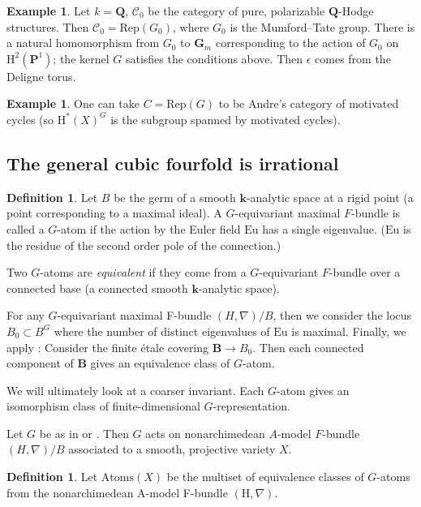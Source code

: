 \documentclass[11pt, reqno]{amsart}
\numberwithin{equation}{section}
\theoremstyle{plain}
\theoremstyle{definition}
\newtheorem{definition}[theorem]{Definition}
\newtheorem{example}[theorem]{Example}
\theoremstyle{italicsname}
\newcommand{\bB}{\mathbf{B}}
\newcommand{\Atoms}{\mathrm{Atoms}}
\newcommand{\cC}{\mathscr{C}}
\newcommand{\rH}{\mathrm{H}}
\newcommand{\bG}{\mathbf{G}}
\newcommand{\bP}{\mathbf{P}}
\newcommand{\bQ}{\mathbf{Q}}
\newcommand{\bk}{\mathbf{k}}
\newcommand{\euler}{\mathrm{Eu}}
\begin{document}
\begin{example}
\label{ex:mumford-tate}
    Let $k = \bQ$, $\cC_0$ be the category of pure, polarizable $\bQ$-Hodge structures. Then $\cC_0 = \mathrm{Rep}(G_0)$, where $G_0$ is the Mumford--Tate group. There is a natural homomorphism from $G_0$ to $\bG_m$ corresponding to the action of $G_0$ on $\rH^2(\bP^1)$; the kernel $G$ satisfies the conditions above. Then $\epsilon$ comes from the Deligne torus. 
\end{example}

\begin{example}
\label{ex:motivated-cycle}
    One can take $C = \mathrm{Rep}(G)$ to be Andre's category of motivated cycles (so $\rH^*(X)^G$ is the subgroup spanned by motivated cycles).
\end{example}

\subsection{The general cubic fourfold is irrational}

\begin{definition}
Let $B$ be the germ of a smooth $\bk$-analytic space at a rigid point (a point corresponding to a maximal ideal). A $G$-equivariant maximal $F$-bundle is called a $G$-atom if the action by the Euler field $\euler$ has a single eigenvalue. ($\euler$ is the residue of the second order pole of the connection.)

Two $G$-atoms are \emph{equivalent} if they come from a $G$-equivariant $F$-bundle over a connected base (a connected smooth $\bk$-analytic space).
\end{definition}

For any $G$-equivariant maximal F-bundle $(H, \nabla)/B$, then we consider the locus $B_0 \subset B^G$ where the number of distinct eigenvalues of $\euler$ is maximal. Finally, we apply : Consider the finite \'etale covering $\bB \to B_0$. Then each connected component of $\bB$ gives an equivalence class of $G$-atom. 

We will ultimately look at a coarser invariant. Each $G$-atom gives an isomorphism class of finite-dimensional $G$-representation. 

Let $G$ be as in  or . 
Then $G$ acts on nonarchimedean $A$-model $F$-bundle $(H, \nabla)/B$ associated to a smooth, projective variety $X$. 

\begin{definition}
\label{def:atoms}
    Let $\Atoms(X)$ be the multiset of equivalence classes of $G$-atoms from the nonarchimedean A-model F-bundle $(\rH, \nabla)$. 
\end{definition}
\end{document}
